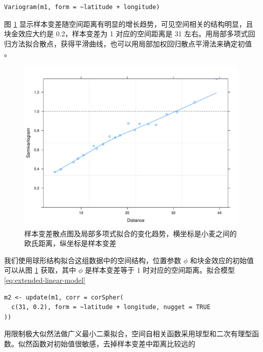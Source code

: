 \documentclass[12pt,a4paper,UTF8,twoside]{book}
\theoremstyle{definition}
\theoremstyle{definition}
\theoremstyle{definition}
\theoremstyle{remark}
\begin{document}
\begin{verbatim}
Variogram(m1, form = ~latitude + longitude)
\end{verbatim}

图 \ref{fig:yields-variogram}
显示样本变差随空间距离有明显的增长趋势，可见空间相关的结构明显，且块金效应大约是
0.2，样本变差为 1 对应的空间距离是 31
左右。用局部多项式回归方法拟合散点，获得平滑曲线，也可以用局部加权回归散点平滑法来确定初值
\citep{Xie2008COS}。

\begin{figure}

{\centering \includegraphics[width=0.7\linewidth]{figures/Yields-Variogram} 

}

\caption{样本变差散点图及局部多项式拟合的变化趋势，横坐标是小麦之间的欧氏距离，纵坐标是样本变差}\label{fig:yields-variogram}
\end{figure}

我们使用球形结构拟合这组数据中的空间结构，位置参数 \(\phi\)
和块金效应的初始值可以从图 \ref{fig:yields-variogram} 获取，其中
\(\phi\) 是样本变差等于 1 时对应的空间距离。拟合模型
\eqref{eq:extended-linear-model}

\begin{verbatim}
m2 <- update(m1, corr = corSpher(
  c(31, 0.2), form = ~latitude + longitude, nugget = TRUE
))
\end{verbatim}

用限制极大似然法做广义最小二乘拟合，空间自相关函数采用球型和二次有理型函数。似然函数对初始值很敏感，去掉样本变差中距离比较远的
\end{document}
